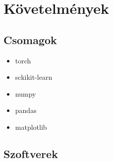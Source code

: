 ﻿\chapter{Követelmények}

\section{Csomagok}
\begin{itemize}
    \item torch
    \item sckikit-learn
    \item numpy
    \item pandas
    \item matplotlib
\end{itemize}
\section{Szoftverek}